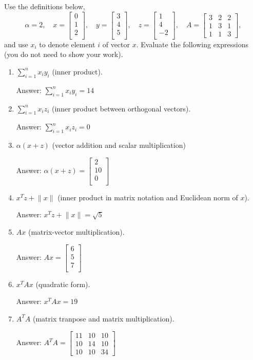 \documentclass{article}
\newcommand{\blu}[1]{{\textcolor{blu}{#1}}}
\newcommand{\gre}[1]{\textcolor{gre}{#1}}
\newcommand\ans[1]{\par\gre{Answer: #1}}
\let\ask\blu
\newcommand{\norm}[1]{\lVert #1 \rVert}
\begin{document}
  Use the definitions below,
  \[
  \alpha = 2,\quad
  x = \left[\begin{array}{c}
  0\\
  1\\
  2\\
  \end{array}\right], \quad
  y = \left[\begin{array}{c}
  3\\
  4\\
  5\\
  \end{array}\right],\quad
  z = \left[\begin{array}{c}
  1\\
  4\\
  -2\\
  \end{array}\right],\quad
  A = \left[\begin{array}{ccc}
  3 & 2 & 2\\
  1 & 3 & 1\\
  1 & 1 & 3
  \end{array}\right],
  \]
  and use $x_i$ to denote element $i$ of vector $x$.
  \ask{Evaluate the following expressions} (you do not need to show your work).
  \begin{enumerate}
  \item $\sum_{i=1}^n x_iy_i$ (inner product).
  \ans{$\sum_{i=1}^n x_iy_i = 14$}
  \item $\sum_{i=1}^n x_i z_i$ (inner product between orthogonal vectors).
  \ans{$\sum_{i=1}^n x_i z_i = 0$}
  \item $\alpha(x+z)$ (vector addition and scalar multiplication)
  \ans{$\alpha(x+z) = \left[\begin{array}{c}2\\10\\0\\\end{array}\right]$}
  \item $x^Tz + \norm{x}$ (inner product in matrix notation and Euclidean norm of $x$).
  \ans{$x^Tz + \norm{x} = \sqrt{5}$}
  \item $Ax$ (matrix-vector multiplication).
  \ans{$Ax = \left[\begin{array}{c}6\\5\\7\\\end{array}\right]$}
  \item $x^TAx$ (quadratic form).
  \ans{$x^TAx = 19$}
  \item $A^TA$ (matrix tranpose and matrix multiplication).
  \ans{$A^TA = \left[\begin{array}{ccc}11 & 10 & 10\\10 & 14 & 10\\10 & 10 & 34\end{array}\right]$}
  \end{enumerate}
  \newpage
  
\end{document}

